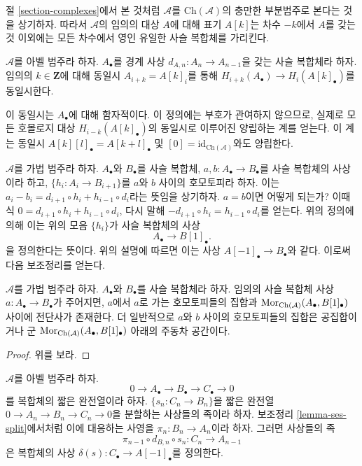 \medskip\noindent
절 \ref{section-complexes}에서 본 것처럼 $\mathcal{A}$를
$\text{Ch}(\mathcal{A})$의 충만한 부분범주로 본다는 것을 상기하자.
따라서 $\mathcal{A}$의 임의의 대상 $A$에 대해 표기 $A[k]$는
차수 $-k$에서 $A$를 갖는 것 이외에는 모든 차수에서 영인 유일한
사슬 복합체를 가리킨다.

\begin{definition}
\label{definition-homology-shift}
$\mathcal{A}$를 아벨 범주라 하자.
$A_\bullet$를 경계 사상 $d_{A, n} : A_n \to A_{n - 1}$을 갖는
사슬 복합체라 하자. 임의의 $k \in \mathbf{Z}$에 대해 동일시
$A_{i + k} = A[k]_i$를 통해
{\it $H_{i + k}(A_\bullet) \rightarrow H_i(A[k]_\bullet)$}를
동일시한다.
\end{definition}

\noindent
이 동일시는 $A_\bullet$에 대해 함자적이다. 이 정의에는 부호가
관여하지 않으므로, 실제로 모든 호몰로지 대상
$H_{i - k}(A[k]_\bullet)$의 동일시로 이루어진 양립하는 계를 얻는다.
이 계는 동일시 $A[k][l]_\bullet = A[k + l]_\bullet$ 및
$[0] = \text{id}_{\text{Ch}(\mathcal{A})}$와도 양립한다.

\medskip\noindent
$\mathcal{A}$를 가법 범주라 하자.
$A_\bullet$와 $B_\bullet$를 사슬 복합체,
$a, b : A_\bullet \to B_\bullet$를 사슬 복합체의 사상이라 하고,
$\{h_i : A_i \to B_{i + 1}\}$를 $a$와 $b$ 사이의 호모토피라 하자.
이는
$a_i - b_i = d_{i + 1} \circ h_i + h_{i - 1} \circ d_i$라는 뜻임을
상기하자. $a = b$이면 어떻게 되는가? 이때 식
$0 = d_{i + 1} \circ h_i + h_{i - 1} \circ d_i$, 다시 말해
$ - d_{i + 1} \circ h_i = h_{i - 1} \circ d_i$를 얻는다.
위의 정의에 의해 이는 위의 모음 $\{h_i\}$가 사슬 복합체의 사상
$$
A_\bullet \longrightarrow B[1]_\bullet.
$$
을 정의한다는 뜻이다. 위의 설명에 따르면 이는 사상
$A[-1]_\bullet \to B_\bullet$와 같다. 이로써 다음 보조정리를 얻는다.

\begin{lemma}
\label{lemma-homotopy-shift}
$\mathcal{A}$를 가법 범주라 하자.
$A_\bullet$와 $B_\bullet$를 사슬 복합체라 하자.
임의의 사슬 복합체 사상 $a : A_\bullet \to B_\bullet$가 주어지면,
$a$에서 $a$로 가는 호모토피들의 집합과
$\mathop{\mathrm{Mor}}\nolimits_{\text{Ch}(\mathcal{A})}(A_\bullet, B[1]_\bullet)$ 사이에
전단사가 존재한다. 더 일반적으로 $a$와 $b$ 사이의 호모토피들의 집합은
공집합이거나 군
$\mathop{\mathrm{Mor}}\nolimits_{\text{Ch}(\mathcal{A})}(A_\bullet, B[1]_\bullet)$ 아래의
주동차 공간이다.
\end{lemma}

\begin{proof}
위를 보라.
\end{proof}

\begin{lemma}
\label{lemma-ses-termwise-split}
$\mathcal{A}$를 아벨 범주라 하자.
$$
0 \to A_\bullet \to B_\bullet \to C_\bullet \to 0
$$
를 복합체의 짧은 완전열이라 하자.
$\{s_n : C_n \to B_n\}$을 짧은 완전열
$0 \to A_n \to B_n \to C_n \to 0$을 분할하는 사상들의 족이라 하자.
보조정리 \ref{lemma-ses-split}에서처럼 이에 대응하는 사영을
$\pi_n : B_n \to A_n$이라 하자. 그러면 사상들의 족
$$
\pi_{n - 1} \circ d_{B, n} \circ s_n
:
C_n \to A_{n - 1}
$$
은 복합체의 사상 $\delta(s) : C_\bullet \to A[-1]_\bullet$를
정의한다.
\end{lemma}

